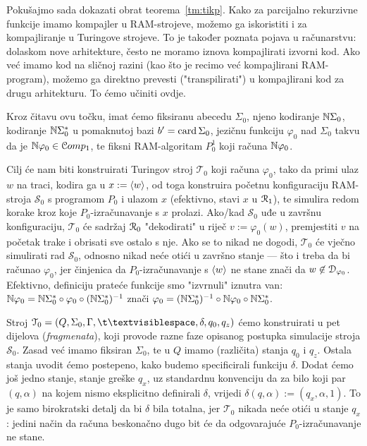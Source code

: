 Pokušajmo sada dokazati obrat teorema~\ref{tm:tikp}. Kako za parcijalno rekurzivne funkcije imamo kompajler u RAM-strojeve, možemo ga iskoristiti i za kompajliranje u Turingove strojeve. To je također poznata pojava u računarstvu: dolaskom nove arhitekture, često ne moramo iznova kompajlirati izvorni kod. Ako već imamo kod na sličnoj razini (kao što je recimo već kompajlirani RAM-program), možemo ga direktno prevesti ("transpilirati") u kompajlirani kod za drugu arhitekturu. To ćemo učiniti ovdje.

Kroz čitavu ovu točku, imat ćemo fiksiranu abecedu $\Sigma_0$, njeno kodiranje ${\mathbb N}\Sigma_0$, kodiranje ${\mathbb N}\Sigma_0^*$ u pomaknutoj bazi $b'=\operatorname{card}\Sigma_0$, jezičnu funkciju $\varphi_0$ nad $\Sigma_0$ takvu da je ${\mathbb N}\varphi_0\in\mathcal Comp_1$, te fiksni RAM-algoritam $P_0^1$ koji računa ${\mathbb N}\varphi_0$. 

Cilj će nam biti konstruirati Turingov stroj $\mathcal T_0$ koji računa $\varphi_0$, tako da primi ulaz $w$ na traci, kodira ga u $x:=\langle w\rangle$, od toga konstruira početnu  konfiguraciju RAM-stroja $\mathcal S_0$ s programom $P_0$ i ulazom $x$ (efektivno, stavi $x$ u $\mathcal R_{1}$), te simulira redom korake kroz koje $P_0$-izračunavanje s $x$ prolazi. Ako\slash kad $\mathcal S_0$ uđe u završnu konfiguraciju, $\mathcal T_0$ će sadržaj $\mathcal R_{0}$ "dekodirati" u riječ $v:=\varphi_0(w)$, premjestiti $v$ na početak trake i obrisati sve ostalo s nje. Ako se to nikad ne dogodi, $\mathcal T_0$ će vječno simulirati rad $\mathcal S_0$, odnosno nikad neće otići u završno stanje --- što i treba da bi računao $\varphi_0$, jer činjenica da $P_0$-izračunavanje s $\langle w\rangle$ ne stane znači da $w\not\in\mathcal D_{\varphi_0}$. Efektivno, definiciju prateće funkcije smo "izvrnuli" iznutra van: ${\mathbb N}\varphi_0={\mathbb N}\Sigma_0^*\circ\varphi_0\circ({\mathbb N}\Sigma_0^*)^{-1}$ znači $\varphi_0=({\mathbb N}\Sigma_0^*)^{-1}\circ{\mathbb N}\varphi_0\circ{\mathbb N}\Sigma_0^*$.

Stroj $\mathcal T_0=(Q,\Sigma_0,\Gamma,\bl,\delta,q_0,q_z)$ ćemo konstruirati u pet dijelova (\emph{fragmenata}), koji provode razne faze opisanog postupka simulacije stroja $\mathcal S_0$. Zasad već imamo fiksiran $\Sigma_0$, te u $Q$ imamo (različita) stanja $q_0$ i $q_z$.
Ostala stanja uvodit ćemo postepeno, kako budemo specificirali funkciju $\delta$. Dodat ćemo još jedno stanje, stanje greške $q_x$, uz standardnu konvenciju da za bilo koji par $(q,\alpha)$ na kojem nismo eksplicitno definirali $\delta$, vrijedi $\delta(q,\alpha):=(q_x,\alpha,1)$. To je samo birokratski detalj da bi $\delta$ bila totalna, jer $\mathcal T_0$ nikada neće otići u stanje $q_x$: jedini način da računa beskonačno dugo bit će da odgovarajuće $P_0$-izračunavanje ne stane.

